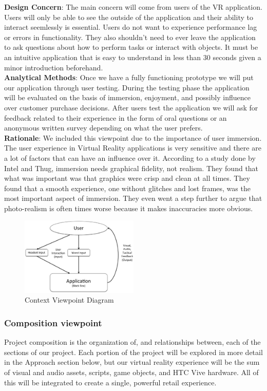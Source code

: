 \documentclass[10pt,journal,compsoc,onecolumn, draftclsnofoot]{IEEEtran}
\begin{document}
\hangindent=0.5cm \textbf{Design Concern}: The main concern will come from
users of the VR application. Users will only be able to see the outside of the
application and their ability to interact seemlessly is essential. Users do not
want to experience performance lag or errors in functionality. They also
shouldn't need to ever leave the application to ask questions about how to
perform tasks or interact with objects. It must be an intuitive application
that is easy to understand in less than 30 seconds given a minor introduction
beforehand. \\

\hangindent=0.5cm \textbf{Analytical Methods}: Once we have a fully functioning
prototype we will put our application through user testing. During the testing
phase the application will be evaluated on the basis of immersion, enjoyment,
and possibly influence over customer purchase decisions. After users test the
application we will ask for feedback related to their experience in the form of
oral questions or an anonymous written survey depending on what the user
prefers. \\

\hangindent=0.5cm \textbf{Rationale}: We included this viewpoint due to the importance of user immersion. The user experience in Virtual Reality applications is very sensitive and there are a lot of factors that can have an influence over it. According to a study done by Intel and Thug\cite{michalak_lind_round1}, immersion needs graphical fidelity, not realism. They found that what was important was that graphics were crisp and clean at all times. They found that a smooth experience, one without glitches and lost frames, was the most important aspect of immersion. They even went a step further to argue that photo-realism is often times worse because it makes inaccuracies more obvious.

\begin{figure}[h]
\centering
\caption{Context Viewpoint Diagram}
\includegraphics[width=0.5\textwidth]{projectContext.eps}
\end{figure}
\subsubsection{Composition viewpoint}
Project composition is the organization of, and relationships between, each of
the sections of our project. Each portion of the project will be explored in
more detail in the Approach section below, but our virtual reality experience
will be the sum of visual and audio assets, scripts, game objects, and HTC Vive
hardware. All of this will be integrated to create a single, powerful retail
experience.\\
\end{document}
